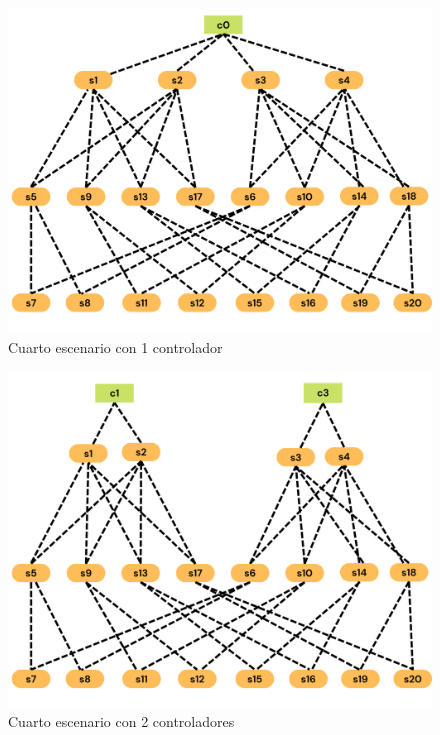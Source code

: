 \documentclass[a4paper, 12pt]{book}
\begin{document}
	\begin{figure}[H]
		\centering
		\includegraphics[width=16cm, keepaspectratio]{img/e4_1}
		\caption{Cuarto escenario con 1 controlador}
		\label{figura:e4_1}
	\end{figure}
	
	\begin{figure}[H]
		\centering
		\includegraphics[width=13cm, keepaspectratio]{img/e4_2}
		\caption{Cuarto escenario con 2 controladores}
		\label{figura:e4_2}
	\end{figure}
	
\end{document}

